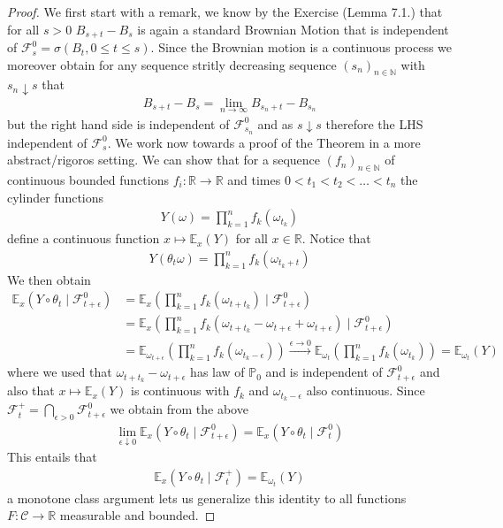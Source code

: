 \documentclass[11pt,a4paper, final]{article}
\theoremstyle{definition}
\begin{document}
\begin{proof}
We first start with a remark, we know by the Exercise (Lemma 7.1.) that for all $s>0$ $B_{s+t}-B_s$ is again a standard Brownian Motion that is independent of $\mathcal{F}_s^0 = \sigma (B_t, 0 \leq t \leq s)$. Since the Brownian motion is a continuous process we moreover obtain for any sequence stritly decreasing sequence $(s_n)_{n \in \mathbb{N}}$ with $s_n \downarrow s$ that 
\begin{align*}
B_{s+t}-B_s = \lim_{n \to \infty} B_{s_n + t}-B_{s_n}
\end{align*}
but the right hand side is independent of $\mathcal{F}_{s_n}^0$ and as $s \downarrow s$ therefore the LHS independent of $\mathcal{F}_s^0$. We work now towards a proof of the Theorem in a more abstract/rigoros setting.
\newpage
We can show that for a sequence $(f_n)_{n \in \mathbb{N}}$ of continuous bounded functions $f_i : \mathbb{R} \to \mathbb{R}$ and times $0 < t_1< t_2 < \dots < t_n$ the cylinder functions 
\begin{align*}
Y( \omega) = \prod_{k=1}^n f_k( \omega_{t_k})
\end{align*}
define a continuous function $x \mapsto \mathbb{E}_x(Y)$ for all $x \in \mathbb{R}$. Notice that \begin{align*}
Y( \theta_t \omega) = \prod_{k=1}^n f_k ( \omega_{t_k + t})
\end{align*}
We then obtain
\begin{align*}
\mathbb{E}_x( Y \circ \theta_t \mid \mathcal{F}_{t + \epsilon}^0) &= \mathbb{E}_x \left( \prod_{k=1}^n f_k( \omega_{t + t_k}) \mid \mathcal{F}_{t+ \epsilon}^0 \right) \\
& = \mathbb{E}_x \left( \prod_{k=1}^n f_k( \omega_{t+t_k} - \omega_{t + \epsilon} + \omega_{t + \epsilon}) \mid \mathcal{F}_{t + \epsilon}^0 \right) \\
& = \mathbb{E}_{\omega_{t + \epsilon}} \left( \prod_{k=1}^n f_k( \omega_{t_k - \epsilon}) \right) \overset{ \epsilon \to 0}\longrightarrow \mathbb{E}_{ \omega_t} \left( \prod_{k=1}^n f_k ( \omega_{t_k}) \right) = \mathbb{E}_{ \omega_t}(Y)
\end{align*}
where we used that $\omega_{t+ t_k}- \omega_{t + \epsilon}$ has law of $\mathbb{P}_0$ and is independent of $\mathcal{F}_{t + \epsilon}^0$ and also that $x \mapsto \mathbb{E}_x(Y)$ is continuous with $f_k$ and $\omega_{t_k- \epsilon}$ also continuous. Since $\mathcal{F}_t^+ = \bigcap_{ \epsilon >0} \mathcal{F}_{t + \epsilon}^0$ we obtain from the above 
\begin{align*}
\lim_{ \epsilon \downarrow 0 } \mathbb{E}_x ( Y \circ \theta_t \mid \mathcal{F}_{t + \epsilon}^0 ) = \mathbb{E}_x( Y \circ \theta_t \mid \mathcal{F}_{t}^0 )
\end{align*}
This entails that \begin{align*}
\mathbb{E}_x( Y \circ \theta_t \mid \mathcal{F}_t^+) = \mathbb{E}_{ \omega_t}(Y)
\end{align*}
a monotone class argument lets us generalize this identity to all functions $F : \mathcal{C} \to \mathbb{R}$ measurable and bounded. 
\end{proof}
\end{document}
